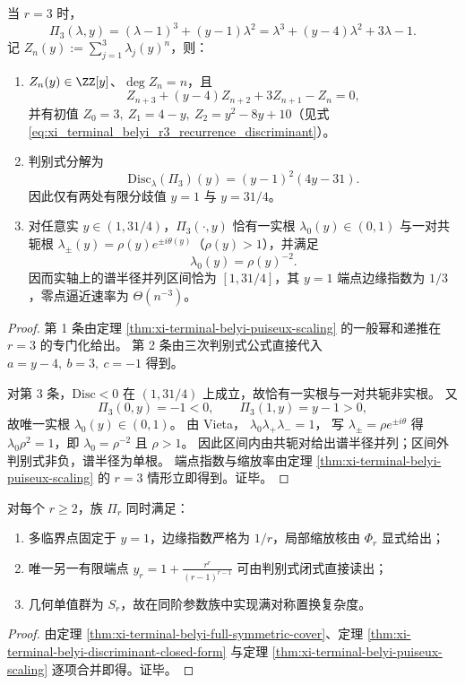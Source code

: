 

\begin{proposition}[\(r=3\) 的显式 Lee--Yang 区间与三次尖点指数]\label{prop:xi-terminal-belyi-r3-explicit-leyang-interval}
当 \(r=3\) 时，
\[
\Pi_3(\lambda,y)=(\lambda-1)^3+(y-1)\lambda^2
=\lambda^3+(y-4)\lambda^2+3\lambda-1.
\]
记 \(Z_n(y):=\sum_{j=1}^{3}\lambda_j(y)^n\)，则：
\begin{enumerate}
  \item \(Z_n(y)\in\ZZ[y]\)、\(\deg Z_n=n\)，且
  \[
  Z_{n+3}+(y-4)Z_{n+2}+3Z_{n+1}-Z_n=0,
  \]
  并有初值
  \(
  Z_0=3,\ Z_1=4-y,\ Z_2=y^2-8y+10
  \)（见式 \eqref{eq:xi_terminal_belyi_r3_recurrence_discriminant}）。
  \item 判别式分解为
  \[
  \mathrm{Disc}_{\lambda}(\Pi_3)(y)=(y-1)^2(4y-31).
  \]
  因此仅有两处有限分歧值 \(y=1\) 与 \(y=31/4\)。
  \item 对任意实 \(y\in(1,31/4)\)，\(\Pi_3(\cdot,y)\) 恰有一实根 \(\lambda_0(y)\in(0,1)\) 与一对共轭根
  \(
  \lambda_\pm(y)=\rho(y)e^{\pm i\theta(y)}
  \)（\(\rho(y)>1\)），并满足
  \[
  \lambda_0(y)=\rho(y)^{-2}.
  \]
  因而实轴上的谱半径并列区间恰为 \([1,31/4]\)，其 \(y=1\) 端点边缘指数为 \(1/3\)，零点逼近速率为 \(\Theta(n^{-3})\)。
\end{enumerate}
\end{proposition}
\begin{proof}
第 1 条由定理 \ref{thm:xi-terminal-belyi-puiseux-scaling} 的一般幂和递推在 \(r=3\) 的专门化给出。
第 2 条由三次判别式公式直接代入
\(
a=y-4,\ b=3,\ c=-1
\)
得到。

对第 3 条，\(\mathrm{Disc}<0\) 在 \((1,31/4)\) 上成立，故恰有一实根与一对共轭非实根。
又
\[
\Pi_3(0,y)=-1<0,\qquad
\Pi_3(1,y)=y-1>0,
\]
故唯一实根 \(\lambda_0(y)\in(0,1)\)。
由 Vieta，
\(
\lambda_0\lambda_+\lambda_-=1
\)，
写 \(\lambda_\pm=\rho e^{\pm i\theta}\) 得
\(
\lambda_0\rho^2=1
\)，即 \(\lambda_0=\rho^{-2}\) 且 \(\rho>1\)。
因此区间内由共轭对给出谱半径并列；区间外判别式非负，谱半径为单根。
端点指数与缩放率由定理 \ref{thm:xi-terminal-belyi-puiseux-scaling} 的 \(r=3\) 情形立即得到。证毕。
\end{proof}

\begin{corollary}\label{cor:xi-terminal-belyi-adjustable-exponent-maximal-galois}
对每个 \(r\ge2\)，族 \(\Pi_r\) 同时满足：
\begin{enumerate}
  \item 多临界点固定于 \(y=1\)，边缘指数严格为 \(1/r\)，局部缩放核由 \(\Phi_r\) 显式给出；
  \item 唯一另一有限端点 \(y_r=1+\frac{r^r}{(r-1)^{r-1}}\) 可由判别式闭式直接读出；
  \item 几何单值群为 \(S_r\)，故在同阶参数族中实现满对称置换复杂度。
\end{enumerate}
\end{corollary}
\begin{proof}
由定理 \ref{thm:xi-terminal-belyi-full-symmetric-cover}、定理 \ref{thm:xi-terminal-belyi-discriminant-closed-form} 与定理 \ref{thm:xi-terminal-belyi-puiseux-scaling} 逐项合并即得。证毕。
\end{proof}

